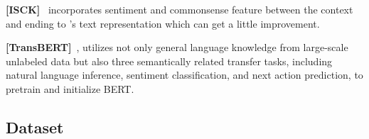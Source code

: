 \textbf{[ISCK]}~\cite{chen2018incorporating} incorporates  sentiment and 
commonsense feature between the context and ending to 
\citeauthor{radford2018improving}'s text representation which can get a little improvement.


\textbf{[TransBERT]}~\cite{li2019story}, utilizes not only 
general language knowledge
 from large-scale unlabeled data but also  three
semantically related transfer tasks, including natural language
inference, sentiment classification, and next action
prediction, to pretrain and initialize BERT. 


\subsection{Dataset}
\label{sec:dataset}


